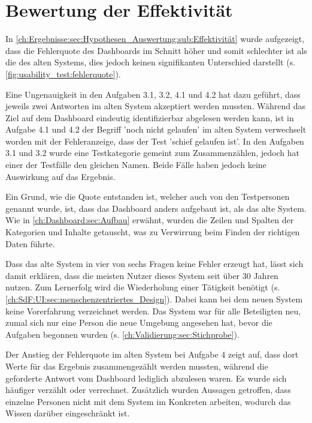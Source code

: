 \section{Bewertung der Effektivität}
\label{ch:Diskussion:Effektivität}

In \autoref{ch:Ergebnisse:sec:Hypothesen_Auswertung:sub:Effektivität} wurde aufgezeigt, dass die Fehlerquote des Dash\-boards im Schnitt höher und somit schlechter ist als die des alten Systems, dies jedoch keinen signifikanten Unterschied darstellt (s. \autoref{fig:usability_test:fehlerquote}).

Eine Ungenauigkeit in den Aufgaben 3.1, 3.2, 4.1 und 4.2 hat dazu geführt, dass jeweils zwei Antworten im alten System akzeptiert werden mussten. Während das Ziel auf dem Dash\-board eindeutig identifizierbar abgelesen werden kann, ist in Aufgabe 4.1 und 4.2 der Begriff 'noch nicht gelaufen' im alten System verwechselt worden mit der Fehleranzeige, dass der Test 'schief gelaufen ist'. In den Aufgaben 3.1 und 3.2 wurde eine Testkategorie gemeint zum Zusammenzählen, jedoch hat einer der Testfälle den gleichen Namen. Beide Fälle haben jedoch keine Auswirkung auf das Ergebnis.

Ein Grund, wie die Quote entstanden ist, welcher auch von den Testpersonen genannt wurde, ist, dass das Dash\-board anders aufgebaut ist, als das alte System. Wie in \autoref{ch:Dashboard:sec:Aufbau} erwähnt, wurden die Zeilen und Spalten der Kategorien und Inhalte getauscht, was zu Verwirrung beim Finden der richtigen Daten führte.

Dass das alte System in vier von sechs Fragen keine Fehler erzeugt hat, lässt sich damit erklären, dass die meisten Nutzer dieses System seit über 30 Jahren nutzen. Zum Lernerfolg wird die Wiederholung einer Tätigkeit benötigt (s. \autoref{ch:SdF:UI:sec:menschenzentriertes_Design}). Dabei kann bei dem neuen System keine Vorerfahrung verzeichnet werden. Das System war für alle Beteiligten neu, zumal sich nur eine Person die neue Umgebung angesehen hat, bevor die Aufgaben begonnen wurden (s. \autoref{ch:Validierung:sec:Stichprobe}).

Der Anstieg der Fehlerquote im alten System bei Aufgabe 4 zeigt auf, dass dort Werte für das Ergebnis zusammengezählt werden mussten, während die geforderte Antwort vom Dash\-board lediglich abzulesen  waren. Es wurde sich häufiger verzählt oder verrechnet. Zusätzlich wurden Aussagen getroffen, dass einzelne Personen nicht mit dem System im Konkreten arbeiten, wodurch das Wissen darüber eingeschränkt ist.

